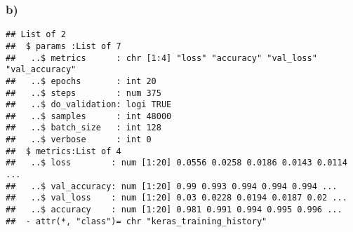 \documentclass[]{article}
\newenvironment{Shaded}{\begin{snugshade}}{\end{snugshade}}
\newcommand{\DataTypeTok}[1]{\textcolor[rgb]{0.13,0.29,0.53}{#1}}
\newcommand{\DecValTok}[1]{\textcolor[rgb]{0.00,0.00,0.81}{#1}}
\newcommand{\FloatTok}[1]{\textcolor[rgb]{0.00,0.00,0.81}{#1}}
\newcommand{\KeywordTok}[1]{\textcolor[rgb]{0.13,0.29,0.53}{\textbf{#1}}}
\newcommand{\NormalTok}[1]{#1}
\newcommand{\OperatorTok}[1]{\textcolor[rgb]{0.81,0.36,0.00}{\textbf{#1}}}
\newcommand{\StringTok}[1]{\textcolor[rgb]{0.31,0.60,0.02}{#1}}
\begin{document}
\hypertarget{b-3}{%
\subsubsection{b)}\label{b-3}}

\begin{Shaded}
\end{Shaded}

\begin{verbatim}
## List of 2
##  $ params :List of 7
##   ..$ metrics      : chr [1:4] "loss" "accuracy" "val_loss" "val_accuracy"
##   ..$ epochs       : int 20
##   ..$ steps        : num 375
##   ..$ do_validation: logi TRUE
##   ..$ samples      : int 48000
##   ..$ batch_size   : int 128
##   ..$ verbose      : int 0
##  $ metrics:List of 4
##   ..$ loss        : num [1:20] 0.0556 0.0258 0.0186 0.0143 0.0114 ...
##   ..$ val_accuracy: num [1:20] 0.99 0.993 0.994 0.994 0.994 ...
##   ..$ val_loss    : num [1:20] 0.03 0.0228 0.0194 0.0187 0.02 ...
##   ..$ accuracy    : num [1:20] 0.981 0.991 0.994 0.995 0.996 ...
##  - attr(*, "class")= chr "keras_training_history"
\end{verbatim}
\end{document}

